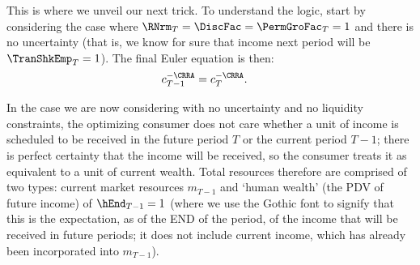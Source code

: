 \documentclass[titlepage, headings=optiontotocandhead]{\econtex}
\begin{document}
This is where we unveil our next trick.  To understand the logic,
start by considering the case where $\RNrm_{T} = \DiscFac =
\PermGroFac_{T} = 1$ and there is no uncertainty
 (that is, we know for sure that income next period
will be $\TranShkEmp_{T} = 1$).  The final Euler equation is then:
\begin{equation}\begin{gathered}\begin{aligned}
      {c}_{T-1}^{-\CRRA}  & = {c}_{T}^{-\CRRA}.
    \end{aligned}\end{gathered}\end{equation}

In the case we are now considering with no uncertainty and no liquidity
constraints, the optimizing consumer does not care whether a unit of
income is scheduled to be received in the future period $T$ or the
current period $T-1$; there is perfect certainty that the income will
be received, so the consumer treats it as equivalent to a unit of
current wealth.  Total resources therefore are comprised of two types:
current market resources ${m}_{T-1}$ and `human wealth' (the PDV of
future income) of $\hEnd_{T-1}=1$ (where we use the Gothic font to
signify that this is the expectation, as of the END of the period, of
the income that will be received in future periods; it does not
include current income, which has already been incorporated into
${m}_{T-1}$).
\end{document}
